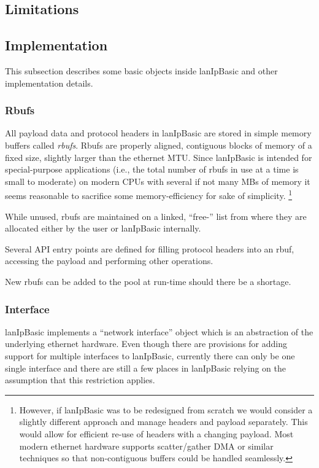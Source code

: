 \documentclass{article}
\newcommand{\lip}{lanIpBasic}
\newcommand{\ethn}{ethernet}
\newcommand{\rbuf}{{rbuf}}
\newcommand{\Rbuf}{{Rbuf}}
\begin{document}
  \subsection{Limitations}
  \subsection{Implementation}
This subsection describes some basic objects inside 
\lip{} and other implementation details.
    \subsubsection{\Rbuf{}s}
All payload data and protocol headers in \lip{} are stored
in simple memory buffers called {\em \rbuf{}s}. \Rbuf{}s are
properly aligned, contiguous blocks of memory of a fixed size,
slightly larger than the \ethn{} MTU. Since \lip{} is intended for 
special-purpose applications (i.e., the total number of \rbuf{}s
in use at a time is small to moderate) on modern CPUs with several
if not many MBs of memory it seems reasonable to sacrifice 
some memory-efficiency for sake of simplicity.%
\footnote{
  However, if \lip{} was to be redesigned from scratch we would
  consider a slightly different approach and manage headers and
  payload separately. This would allow for efficient re-use of
  headers with a changing payload. Most modern \ethn{} hardware
  supports scatter/gather DMA or similar techniques so that
  non-contiguous buffers could be handled seamlessly.%
}

While unused, \rbuf{}s are maintained on a linked, ``free-'' list
from where they are allocated either by the user or \lip{} 
internally.

Several API entry points are defined for filling protocol
headers into an \rbuf, accessing the payload and performing
other operations.

New \rbuf{}s can be added to the pool at run-time should there
be a shortage.
	\subsubsection{Interface}
\lip{} implements a ``network interface'' object which is an abstraction
of the underlying \ethn{} hardware. Even though there are provisions
for adding support for multiple interfaces to \lip{}, currently there
can only be one single interface and there are still a few places
in \lip{} relying on the assumption that this restriction applies.
\end{document}
